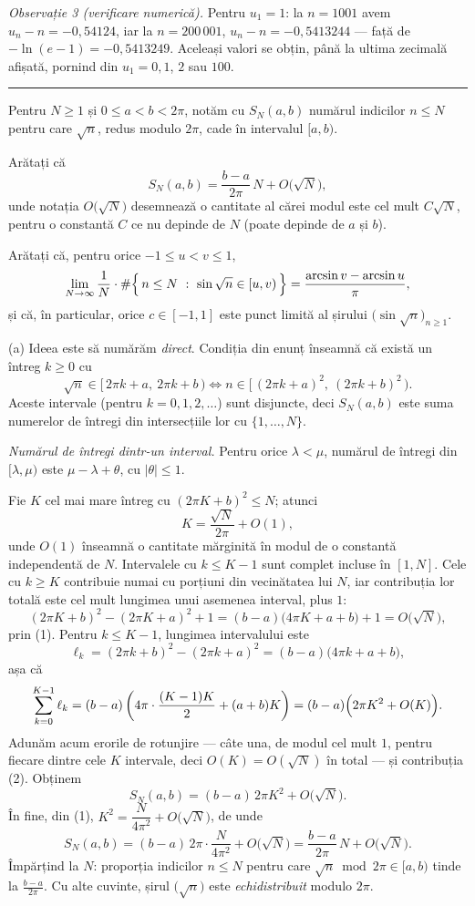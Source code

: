 \emph{Observație 3 (verificare numerică).} Pentru $u_{1}=1$: la $n=1001$ avem $u_{n}-n=-0{,}54124$, iar la $n=200\,001$, $u_{n}-n=-0{,}5413244$ --- față de $-\ln(e-1)=-0{,}5413249$. Aceleași valori se obțin, până la ultima zecimală afișată, pornind din $u_{1}=0{,}1$, $2$ sau $100$.
\vspace{1mm}\hrule

Pentru $N\ge1$ și $0\le a<b<2\pi$, notăm cu $S_N(a,b)$ numărul indicilor $n\le N$ pentru care $\sqrt n$, redus modulo $2\pi$, cade în intervalul $[a,b)$.
\begin{parti}
  \item Arătați că
  \[ S_N(a,b)=\frac{b-a}{2\pi}\,N+O\bigl(\sqrt N\bigr) , \]
  unde notația $O\bigl(\sqrt N\bigr)$ desemnează o cantitate al cărei modul este cel mult $C\sqrt N$, pentru o constantă $C$ ce nu depinde de $N$ (poate depinde de $a$ și $b$).
  \item Arătați că, pentru orice $-1\le u<v\le1$,
  \[ \lim_{N\to\infty}\frac{1}{N}\cdot\#\Bigl\{\,n\le N\ :\ \sin\sqrt n\in[u,v)\,\Bigr\}=\frac{\arcsin v-\arcsin u}{\pi} , \]
  și că, în particular, orice $c\in[-1,1]$ este punct limită al șirului $\bigl(\sin\sqrt n\bigr)_{n\ge1}$.
\end{parti}
\sol (a) Ideea este să numărăm \emph{direct}. Condiția din enunț înseamnă că există un întreg $k\ge0$ cu
\[ \sqrt n\in\bigl[\,2\pi k+a,\ 2\pi k+b\,\bigr) \iff n\in\bigl[\,(2\pi k+a)^{2},\ (2\pi k+b)^{2}\,\bigr) . \]
Aceste intervale (pentru $k=0,1,2,\dots$) sunt disjuncte, deci $S_N(a,b)$ este suma numerelor de întregi din intersecțiile lor cu $\{1,\dots,N\}$.

\emph{Numărul de întregi dintr-un interval.} Pentru orice $\lambda<\mu$, numărul de întregi din $[\lambda,\mu)$ este $\mu-\lambda+\theta$, cu $|\theta|\le1$.

Fie $K$ cel mai mare întreg cu $(2\pi K+b)^{2}\le N$; atunci
\[ K=\frac{\sqrt N}{2\pi}+O(1) , \tag{1} \]
unde $O(1)$ înseamnă o cantitate mărginită în modul de o constantă independentă de $N$.
Intervalele cu $k\le K-1$ sunt complet incluse în $[1,N]$. Cele cu $k\ge K$ contribuie numai cu porțiuni din vecinătatea lui $N$, iar contribuția lor totală este cel mult lungimea unui asemenea interval, plus $1$:
\[ (2\pi K+b)^{2}-(2\pi K+a)^{2}+1=(b-a)\bigl(4\pi K+a+b\bigr)+1=O\bigl(\sqrt N\bigr) , \tag{2} \]
prin (1). Pentru $k\le K-1$, lungimea intervalului este
\[ \ell_k=(2\pi k+b)^{2}-(2\pi k+a)^{2}=(b-a)\bigl(4\pi k+a+b\bigr) , \]
așa că
\[ \sum_{k=0}^{K-1}\ell_k=(b-a)\left(4\pi\cdot\frac{(K-1)K}{2}+(a+b)K\right)=(b-a)\Bigl(2\pi K^{2}+O(K)\Bigr) . \]
Adunăm acum erorile de rotunjire --- câte una, de modul cel mult $1$, pentru fiecare dintre cele $K$ intervale, deci $O(K)=O(\sqrt N)$ în total --- și contribuția (2). Obținem
\[ S_N(a,b)=(b-a)\,2\pi K^{2}+O\bigl(\sqrt N\bigr) . \]
În fine, din (1), $K^{2}=\dfrac{N}{4\pi^{2}}+O\bigl(\sqrt N\bigr)$, de unde
\[ S_N(a,b)=(b-a)\,2\pi\cdot\frac{N}{4\pi^{2}}+O\bigl(\sqrt N\bigr)=\frac{b-a}{2\pi}\,N+O\bigl(\sqrt N\bigr) . \]
Împărțind la $N$: proporția indicilor $n\le N$ pentru care $\sqrt n\bmod2\pi\in[a,b)$ tinde la $\frac{b-a}{2\pi}$. Cu alte cuvinte, șirul $\bigl(\sqrt n\bigr)$ este \emph{echidistribuit} modulo $2\pi$.

